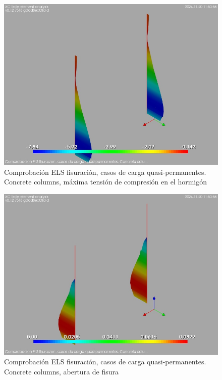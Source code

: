 \begin{figure}[ht]
\begin{center}
\includegraphics[width=\linewidth]{results/graphics/crackingSLS_qperm/columnZconcrsigma_c}
\caption{Comprobación ELS fisuración, casos de carga quasi-permanentes. Concrete columns, máxima tensión de compresión en el hormigón}
\label{SLS_quasiPermanentLoadsCrackControlcolumnZconcrsigma_c}
\end{center}
\end{figure}
\begin{figure}[ht]
\begin{center}
\includegraphics[width=\linewidth]{results/graphics/crackingSLS_qperm/columnZconcrwk}
\caption{Comprobación ELS fisuración, casos de carga quasi-permanentes. Concrete columns, abertura de fisura}
\label{SLS_quasiPermanentLoadsCrackControlcolumnZconcrwk}
\end{center}
\end{figure}

